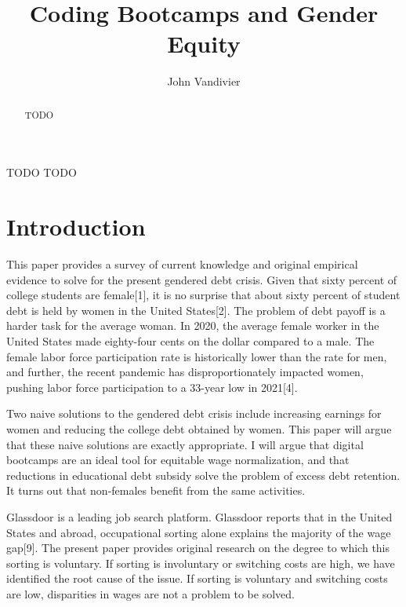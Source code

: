 \documentclass[review]{elsarticle}
\begin{document}
\begin{frontmatter}

    \title{
        Coding Bootcamps and Gender Equity
    }

    \author[mymainaddress]{John Vandivier}

    \begin{abstract}
        TODO
    \end{abstract}

    \begin{keyword}
        TODO %
        \MSC[2010] TODO %
    \end{keyword}

\end{frontmatter}

\pagebreak
\linenumbers

\section{Introduction}

This paper provides a survey of current knowledge and original empirical evidence to solve for the present gendered debt crisis.
Given that sixty percent of college students are female[1],
it is no surprise that about sixty percent of student debt is held by women in the United States[2].
The problem of debt payoff is a harder task for the average woman.
In 2020, the average female worker in the United States made eighty-four cents on the dollar compared to a male.
The female labor force participation rate is historically lower than the rate for men,
and further,
the recent pandemic has disproportionately impacted women, pushing labor force participation to a 33-year low in 2021[4].

Two naive solutions to the gendered debt crisis include
increasing earnings for women
and reducing the college debt obtained by women.
This paper will argue that these naive solutions are exactly appropriate.
I will argue that digital bootcamps are an ideal tool for equitable wage normalization,
and that reductions in educational debt subsidy solve the problem of excess debt retention.
It turns out that non-females benefit from the same activities.


Glassdoor is a leading job search platform.
Glassdoor reports that in the United States and abroad, occupational sorting alone explains the majority of the wage gap[9].
The present paper provides original research on the degree to which this sorting is voluntary.
If sorting is involuntary or switching costs are high, we have identified the root cause of the issue.
If sorting is voluntary and switching costs are low, disparities in wages are not a problem to be solved.
\end{document}
